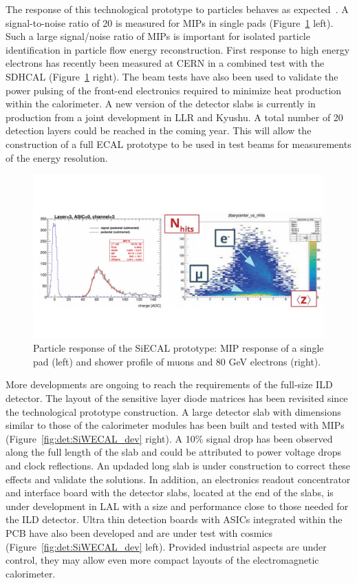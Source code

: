 The response of this technological prototype to particles behaves as expected~\cite{Kawagoe:2019dzh}. A signal-to-noise ratio of 20 is measured for MIPs in single pads (Figure~\ref{fig:det:SiWECAL_signals} left). Such a large signal/noise ratio of MIPs is important for isolated particle identification in particle flow energy reconstruction. First response to high energy electrons has recently been measured at CERN in a combined test with the SDHCAL (Figure~\ref{fig:det:SiWECAL_signals} right). The beam tests have also been used to validate the power pulsing of the front-end electronics required to minimize heat production within the calorimeter. A new version of the detector slabs is currently in production from a joint development in LLR and Kyushu. A total number of 20 detection layers could be reached in the coming year. This will allow the construction of a full ECAL prototype to be used in test beams for measurements of the energy resolution.

\begin{figure}[t!]
\centering
\includegraphics[width=1.0\hsize]{Detector/fig/SiWECAL_signals.jpg}
\caption{Particle response of the SiECAL prototype: MIP response of a single pad (left) and shower profile of muons and 80 GeV electrons (right).}
\label{fig:det:SiWECAL_signals}
\end{figure}

More developments are ongoing to reach the requirements of the full-size ILD detector. The layout of the sensitive layer diode matrices has been revisited since the technological prototype construction. A large detector slab with dimensions similar to those of the calorimeter modules has been built and tested with MIPs~\cite{Balagura:2017vvf} (Figure~\ref{fig:det:SiWECAL_dev} right). A 10\% signal drop has been observed along the full length of the slab and could be attributed to power voltage drops and clock reflections. An updaded long slab is under construction to correct these effects and validate the solutions. In addition, an electronics readout concentrator and interface board with the detector slabs, located at the end of the slabs, is under development in LAL with a size and performance close to those needed for the ILD detector. Ultra thin detection boards with ASICs integrated within the PCB have also been developed and are under test with cosmics (Figure~\ref{fig:det:SiWECAL_dev} left). Provided industrial aspects are under control, they may allow even more compact layouts of the electromagnetic calorimeter. 

